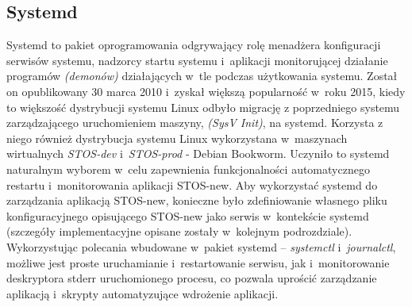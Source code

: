 \subsection{Systemd}
Systemd to pakiet oprogramowania odgrywający rolę menadżera konfiguracji serwisów systemu, nadzorcy startu systemu i~aplikacji monitorującej działanie programów \textit{(demonów)} działających w~tle podczas użytkowania systemu\cite{systemd}. Został on opublikowany 30 marca 2010 i~zyskał większą popularność w~roku 2015, kiedy to większość dystrybucji systemu Linux odbyło migrację z poprzedniego systemu zarządzającego uruchomieniem maszyny, \textit{(SysV Init)}, na systemd. Korzysta z niego również dystrybucja systemu Linux wykorzystana w~maszynach wirtualnych \textit{STOS-dev} i~\textit{STOS-prod} - Debian Bookworm. Uczyniło to systemd naturalnym wyborem w~celu zapewnienia funkcjonalności automatycznego restartu i~monitorowania aplikacji STOS-new. 
\newline \noindent Aby wykorzystać systemd do zarządzania aplikacją STOS-new, konieczne było zdefiniowanie własnego pliku konfiguracyjnego opisującego STOS-new jako serwis w~kontekście systemd (szczegóły implementacyjne opisane zostały w~kolejnym podrozdziale)\cite{systemd-service}. Wykorzystując polecania wbudowane w~pakiet systemd -- \textit{systemctl} i~\textit{journalctl}, możliwe jest proste uruchamianie i~restartowanie serwisu, jak i~monitorowanie deskryptora stderr uruchomionego procesu, co pozwala uprościć zarządzanie aplikacją i~skrypty automatyzujące wdrożenie aplikacji.
